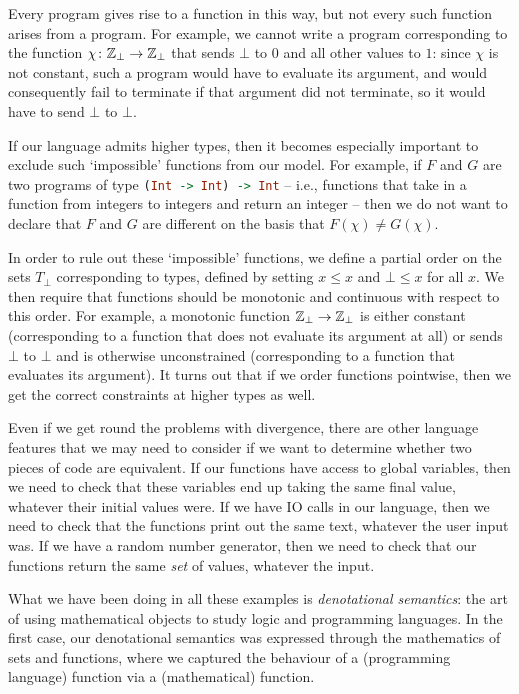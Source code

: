 Every program gives rise to a function in this way, but not every such function arises from a program.
For example, we cannot write a program corresponding to the function $\chi\colon\mathbb{Z}_\bot \to \mathbb{Z}_\bot$ that sends $\bot$ to $0$ and all other values to $1$: since $\chi$ is not constant, such a program would have to evaluate its argument, and would consequently fail to terminate if that argument did not terminate, so it would have to send $\bot$ to $\bot$.

If our language admits higher types, then it becomes especially important to exclude such `impossible' functions from our model.
For example, if $F$ and $G$ are two programs of type \lstinline[language=haskell]{(Int -> Int) -> Int} -- i.e., functions that take in a function from integers to integers and return an integer -- then we do not want to declare that $F$ and $G$ are different on the basis that $F(\chi)\ne G(\chi)$.  

In order to rule out these `impossible' functions, we define a partial order on the sets $T_\bot$ corresponding to types, defined by setting $x\le x$ and $\bot\le x$ for all $x$.
We then require that functions should be monotonic and continuous with respect to this order. 
For example, a monotonic function $\mathbb{Z}_\bot \to \mathbb{Z}_\bot$ is either constant (corresponding to a function that does not evaluate its argument at all) or sends $\bot$ to $\bot$ and is otherwise unconstrained (corresponding to a function that evaluates its argument).
It turns out that if we order functions pointwise, then we get the correct constraints at higher types as well.

Even if we get round the problems with divergence, there are other language features that we may need to consider if we want to determine whether two pieces of code are equivalent. 
If our functions have access to global variables, then we need to check that these variables end up taking the same final value, whatever their initial values were.
If we have IO calls in our language, then we need to check that the functions print out the same text, whatever the user input was.
If we have a random number generator, then we need to check that our functions return the same \emph{set} of values, whatever the input.

What we have been doing in all these examples is \emph{denotational semantics}: the art of using mathematical objects to study logic and programming languages.  
In the first case, our denotational semantics was expressed through the mathematics of sets and functions, where we captured the behaviour of a (programming language) function via a (mathematical) function.

